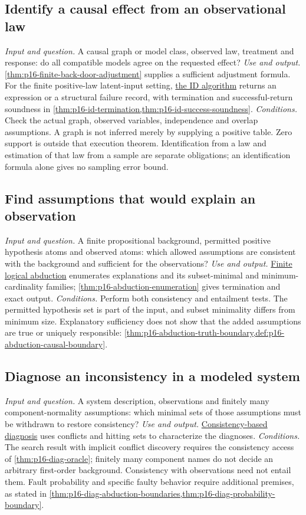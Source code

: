 \subsection{Identify a causal effect from an observational law}
\label{sec:p14-finder-identification}
\textit{Input and question.} A causal graph or model class, observed law,
treatment and response: do all compatible models agree on the requested effect?
\textit{Use and output.}
\cref{thm:p16-finite-back-door-adjustment} supplies a sufficient adjustment
formula. For the finite positive-law latent-input setting,
\hyperref[def:p16-id-algorithm]{the ID algorithm} returns an expression or a
structural failure record, with termination and successful-return soundness in
\cref{thm:p16-id-termination,thm:p16-id-success-soundness}.
\textit{Conditions.} Check the actual graph, observed variables, independence
and overlap assumptions. A graph is not inferred merely by supplying a
positive table. Zero support is outside that execution theorem.
Identification from a law and estimation of that law from a sample are
separate obligations; an identification formula alone gives no sampling
error bound.

\subsection{Find assumptions that would explain an observation}
\label{sec:p14-finder-abduction}
\textit{Input and question.} A finite propositional background, permitted
positive hypothesis atoms and observed atoms: which allowed assumptions are
consistent with the background and sufficient for the observations?
\textit{Use and output.}
\hyperref[def:p16-abduction-enumeration]{Finite logical abduction}
enumerates explanations and its subset-minimal and minimum-cardinality
families; \cref{thm:p16-abduction-enumeration} gives termination and exact
output.
\textit{Conditions.} Perform both consistency and entailment tests. The
permitted hypothesis set is part of the input, and subset minimality differs
from minimum size. Explanatory sufficiency does not show that the added
assumptions are true or uniquely responsible:
\cref{thm:p16-abduction-truth-boundary,def:p16-abduction-causal-boundary}.

\subsection{Diagnose an inconsistency in a modeled system}
\label{sec:p14-finder-diagnosis}
\textit{Input and question.} A system description, observations and finitely
many component-normality assumptions: which minimal sets of those assumptions
must be withdrawn to restore consistency?
\textit{Use and output.}
\hyperref[sec:p16-consistency-based-diagnosis]{Consistency-based diagnosis}
uses conflicts and hitting sets to characterize the diagnoses.
\textit{Conditions.} The search result with implicit conflict discovery
requires the consistency access of \cref{thm:p16-diag-oracle}; finitely many
component names do not decide an arbitrary first-order background.
Consistency with observations need not entail them. Fault probability and
specific faulty behavior require additional premises, as stated in
\cref{thm:p16-diag-abduction-boundaries,thm:p16-diag-probability-boundary}.

